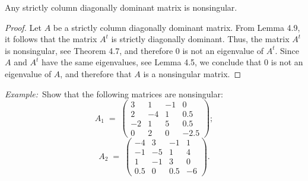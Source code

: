 %
%

\begin{theorem}
Any strictly column diagonally dominant matrix is nonsingular.
\end{theorem}

\begin{proof}
Let $A$ be a strictly column diagonally dominant matrix. From Lemma 4.9, it follows
that the matrix $A^t$ is strictly diagonally dominant. Thus, the matrix $A^t$ is
nonsingular, see Theorem 4.7, and therefore $0$ is not an eigenvalue of $A^t$. Since
$A$ and $A^t$ have the same eigenvalues, see Lemma 4.5, we conclude that $0$ is not an
eigenvalue of $A$, and therefore that $A$ is a nonsingular matrix.
\end{proof}

\par\medskip\noindent\textit{Example:}\ Show that the following matrices are
nonsingular:
\[
A_1 \;=\; \begin{pmatrix}
3 & 1 & -1 & 0\\
2 & -4 & 1 & 0.5\\
-2 & 1 & 5 & 0.5\\
0 & 2 & 0 & -2.5
\end{pmatrix};
\]
\[
A_2 \;=\; \begin{pmatrix}
-4 & 3 & -1 & 1\\
-1 & -5 & 1 & 4\\
1 & -1 & 3 & 0\\
0.5 & 0 & 0.5 & -6
\end{pmatrix}.
\]

